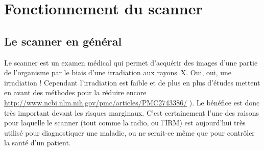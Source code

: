 \documentclass[main.tex]{subfiles}
\begin{document}
%

\section{Fonctionnement du scanner \label{sec:fct_scan}}
\subsection{Le scanner en général}
Le scanner est un examen médical qui permet d'acquérir des images d'une partie de l'organisme par le biais d'une irradiation aux rayons~X. Oui, oui, une irradiation ! Cependant l'irradiation est faible et de plus en plus d'études mettent en avant des méthodes pour la réduire encore  \url{http://www.ncbi.nlm.nih.gov/pmc/articles/PMC2743386/} ). Le bénéfice est donc très important devant les risques marginaux. C'est certainement l'une des raisons pour laquelle le scanner (tout comme la radio, ou l'IRM) est aujourd'hui très utilisé pour diagnostiquer une maladie, ou ne serait-ce même que pour contrôler la santé d'un patient.
\end{document}
